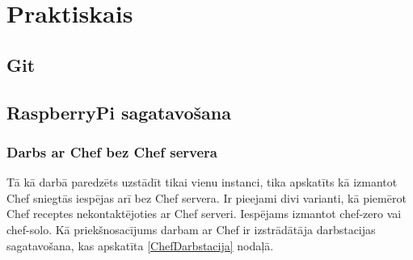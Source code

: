 \chapter{Praktiskais}

\section{Git}

\section{RaspberryPi sagatavošana}

\subsection{Darbs ar Chef bez Chef servera}
Tā kā darbā paredzēts uzstādīt tikai vienu instanci, tika apskatīts kā izmantot Chef sniegtās iespējas arī bez Chef servera. Ir pieejami divi varianti, kā piemērot Chef receptes nekontaktējoties ar Chef serveri. Iespējams izmantot chef-zero vai chef-solo.
Kā priekšnosacījums darbam ar Chef ir izstrādātāja darbstacijas sagatavošana, kas apskatīta \ref{ChefDarbstacija} nodaļā.
